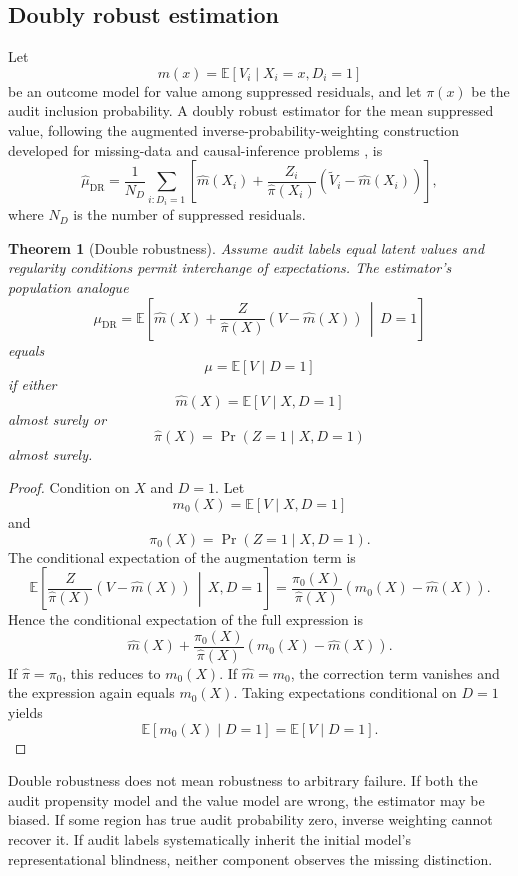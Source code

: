 \documentclass[11pt]{article}
\newtheorem{theorem}[definition]{Theorem}
\theoremstyle{definition}
\DeclareMathOperator{\Prob}{Pr}
\newcommand{\E}{\mathbb{E}}
\newcommand{\given}{\,\middle|\,}
\begin{document}
\subsection{Doubly robust estimation}

Let
\[
m(x)
=
\E[V_i\mid X_i=x,D_i=1]
\]
be an outcome model for value among suppressed residuals, and let \(\pi(x)\) be the audit inclusion probability. A doubly robust estimator for the mean suppressed value, following the augmented inverse-probability-weighting construction developed for missing-data and causal-inference problems \cite{bang2005,robins1994}, is
\[
\widehat{\mu}_{\mathrm{DR}}
=
\frac{1}{N_D}
\sum_{i:D_i=1}
\left[
\widehat m(X_i)
+
\frac{Z_i}{\widehat\pi(X_i)}
\left(
\widetilde V_i-\widehat m(X_i)
\right)
\right],
\]
where \(N_D\) is the number of suppressed residuals.

\begin{theorem}[Double robustness]
Assume audit labels equal latent values and regularity conditions permit interchange of expectations. The estimator's population analogue
\[
\mu_{\mathrm{DR}}
=
\E\left[
\widehat m(X)
+
\frac{Z}{\widehat\pi(X)}
(V-\widehat m(X))
\given D=1
\right]
\]
equals
\[
\mu
=
\E[V\mid D=1]
\]
if either
\[
\widehat m(X)=\E[V\mid X,D=1]
\]
almost surely or
\[
\widehat\pi(X)=\Prob(Z=1\mid X,D=1)
\]
almost surely.
\end{theorem}

\begin{proof}
Condition on \(X\) and \(D=1\). Let
\[
m_0(X)=\E[V\mid X,D=1]
\]
and
\[
\pi_0(X)=\Prob(Z=1\mid X,D=1).
\]
The conditional expectation of the augmentation term is
\[
\E\left[
\frac{Z}{\widehat\pi(X)}
(V-\widehat m(X))
\given X,D=1
\right]
=
\frac{\pi_0(X)}{\widehat\pi(X)}
\left(
m_0(X)-\widehat m(X)
\right).
\]
Hence the conditional expectation of the full expression is
\[
\widehat m(X)
+
\frac{\pi_0(X)}{\widehat\pi(X)}
\left(
m_0(X)-\widehat m(X)
\right).
\]
If \(\widehat\pi=\pi_0\), this reduces to \(m_0(X)\). If \(\widehat m=m_0\), the correction term vanishes and the expression again equals \(m_0(X)\). Taking expectations conditional on \(D=1\) yields
\[
\E[m_0(X)\mid D=1]
=
\E[V\mid D=1].
\]
\end{proof}

Double robustness does not mean robustness to arbitrary failure. If both the audit propensity model and the value model are wrong, the estimator may be biased. If some region has true audit probability zero, inverse weighting cannot recover it. If audit labels systematically inherit the initial model's representational blindness, neither component observes the missing distinction.
\end{document}
